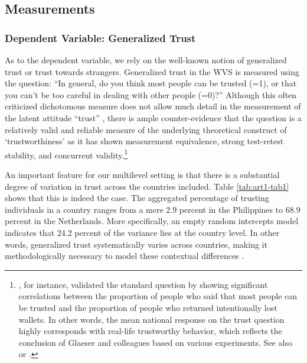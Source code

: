 \subsection{Measurements}

\subsubsection{Dependent Variable: Generalized Trust}
As to the dependent variable, we rely on the well-known notion of generalized trust or trust towards strangers. Generalized trust in the WVS is measured using the question: ``In general, do you think most people can be trusted (=1), or that you can’t be too careful in dealing with other people (=0)?'' Although this often criticized dichotomous measure does not allow much detail in the measurement of the latent attitude ``trust'' \citep[e.g.,][]{Lundmark2016}, there is ample counter-evidence that the question is a relatively valid and reliable measure of the underlying theoretical construct of `trustworthiness' as it has shown measurement equivalence, strong test-retest stability, and concurrent validity.\footnote{\cite{Knack1997}, for instance, validated the standard question by showing significant correlations between the proportion of people who said that most people can be trusted and the proportion of people who returned intentionally lost wallets. In other words, the mean national response on the trust question highly corresponds with real-life trustworthy behavior, which reflects the conclusion of Glaeser and colleagues \citeyear{Glaeser2000} based on various experiments. See also \cite{Delhey2005a} or \cite{Uslaner2012}.}


An important feature for our multilevel setting is that there is a substantial degree of variation in trust across the countries included. Table \ref{tab:art1-tab1} shows that this is indeed the case. The aggregated percentage of trusting individuals in a country ranges from a mere 2.9 percent in the Philippines to 68.9 percent in the Netherlands. More specifically, an empty random intercepts model indicates that 24.2 percent of the variance lies at the country level. In other words, generalized trust systematically varies across countries, making it methodologically necessary to model these contextual differences \citep{Hox2010}.


